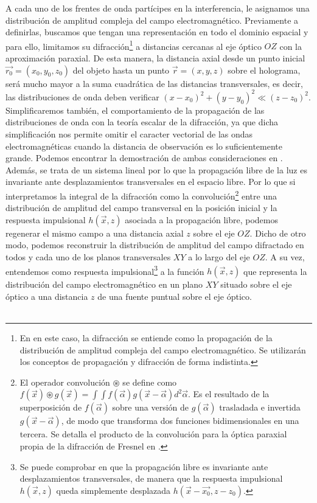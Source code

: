 \documentclass[12pt]{article}
\begin{document}
 A cada uno de los frentes de onda partícipes en la interferencia, le asignamos   una  distribución de amplitud compleja del campo electromagnético. Previamente a definirlas, buscamos que tengan  una representación en todo el dominio espacial y para ello, limitamos su difracción\footnote{En en este caso,  la difracción se entiende como la propagación  de la distribución  de amplitud compleja del campo electromagnético. Se utilizarán los conceptos de propagación y difracción de forma indistinta.} a distancias cercanas al eje óptico $OZ$ con la aproximación paraxial. De esta manera, la distancia axial desde  un punto inicial $\Vec{r_0} = (x_0, y_0, z_0)$ del objeto hasta un punto $\vec{r} = (x, y, z)$  sobre el holograma, será mucho mayor a la suma cuadrática de las distancias transversales, es decir, las distribuciones de onda deben verificar $(x-x_0)^2 + (y-y_0)^{2} \ll (z - z_0)^2$. Simplificaremos también, el comportamiento de la propagación de las distribuciones de onda con la teoría escalar de la difracción,  ya que dicha simplificación  nos permite omitir el caracter vectorial  de las ondas electromagnéticas cuando la distancia de observación es lo suficientemente grande.  Podemos encontrar la demostración de ambas consideraciones  en \cite{6}. Además, se trata de un sistema lineal por lo que la propagación libre de la luz es invariante  ante desplazamientos transversales en el espacio libre.  Por lo que si interpretamos la integral de la difracción como  la convolución\footnote{El operador convolución $\circledast$ se define como $f(\Vec{x}) \circledast g(\Vec{x}) = \int \int f(\Vec{\alpha})g(\Vec{x}- \Vec{\alpha})d^{2}\vec{\alpha}$. Es el resultado de la superposición de $f(\Vec{\alpha})$ sobre una versión de $g(\Vec{\alpha})$ trasladada e invertida $g(\Vec{x}-\Vec{\alpha})$, de modo que  transforma dos funciones bidimensionales en una tercera. Se detalla el producto de la convolución para la óptica paraxial propia  de la difracción de Fresnel  en  \cite{7}.} entre una distribución de amplitud del campo transversal en la posición inicial y la respuesta impulsional $h(\Vec{x}, z)$  asociada a la propagación libre, podemos regenerar el mismo campo  a una distancia axial $z$ sobre el eje $OZ$.  Dicho de otro modo, podemos reconstruir la distribución de amplitud del campo difractado en todos y cada uno de los planos transversales $XY$ a lo largo del eje $OZ$. A su vez, entendemos como  respuesta impulsional\footnote{Se puede comprobar en  \cite{8} que la propagación libre es invariante ante desplazamientos  transversales, de  manera que la respuesta impulsional  $h (\Vec{x}, z)$ queda simplemente desplazada  $h (\Vec{x} - \Vec{x_0}, z - z_0)$.} a la función   $h(\Vec{x}, z)$   que representa la distribución del campo electromagnético en un plano $XY$ situado sobre el eje óptico a una distancia $z$ de una fuente puntual sobre el eje óptico.\\ \\
\end{document}
